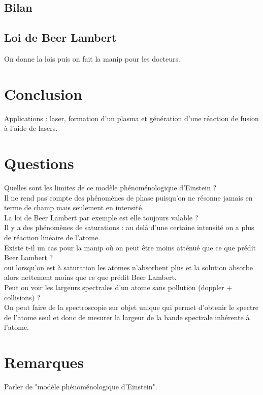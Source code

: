 \documentclass[12pt,prb,aps,epsf]{article}
\begin{document}
\subsection{Bilan}
\subsection{Loi de Beer Lambert}
On donne la lois puis on fait la manip pour les docteurs.

\section{Conclusion}
Applications : laser, formation d'un plasma et génération d'une réaction de fusion à l'aide de lasers.

\section*{Questions}
Quelles sont les limites de ce modèle phénoménologique d'Einstein ?\\ 
Il ne rend pas compte des phénomènes de phase puisqu'on ne résonne jamais en terme de champ mais seulement en intensité.\\

La loi de Beer Lambert par exemple est elle toujours valable ?\\
Il y a des phénomènes de saturations : au delà d'une certaine intensité on a plus de réaction linéaire de l'atome.\\

Existe t-il un cas pour la manip où on peut être moins atténué que ce que prédit Beer Lambert ?\\
oui lorsqu'on est à saturation les atomes n'absorbent plus et la solution absorbe alors nettement moins que ce que prédit Beer Lambert.\\

Peut on voir les largeurs spectrales d'un atome sans pollution (doppler + collisions) ?\\
On peut faire de la spectroscopie sur objet unique qui permet d'obtenir le spectre de l'atome seul et donc de mesurer la largeur de la bande spectrale inhérente à l'atome.


\section*{Remarques}
Parler de "modèle phénoménologique d'Einstein".\\
\end{document}
